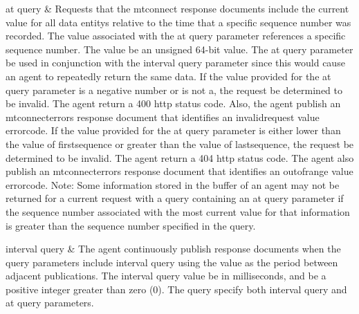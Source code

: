 \begin{longtabu}
\gls{at query}
&
Requests that the \glspl{mtconnect response document} \MUST include the current value for all \glspl{data entity} relative to the time that a specific \gls{sequence number} was recorded.
\newline The value associated with the \gls{at query} parameter references a specific \gls{sequence number}.  The value \MUST be an unsigned 64-bit value.
\newline The \gls{at query} parameter \MUSTNOT be used in conjunction with the \gls{interval query} parameter since this would cause an \gls{agent} to repeatedly return the same data. 
\newline If the value provided for the \gls{at query} parameter is a negative number or is not a, the \gls{request} \MUST be determined to be invalid.  The \gls{agent} \MUST return a 400 \gls{http status code}.  Also, the \gls{agent} \MUST publish an \gls{mtconnecterrors response document} that identifies an \gls{invalidrequest value} \gls{errorcode}. 
\newline If the value provided for the \gls{at query} parameter is either lower than the value of \gls{firstsequence} or greater than the value of \gls{lastsequence}, the \gls{request} \MUST be determined to be invalid.  The \gls{agent} \MUST return a 404 \gls{http status code}.  The \gls{agent} \MUST also publish an \gls{mtconnecterrors response document} that identifies an \gls{outofrange value} \gls{errorcode}. 
\newline Note:  Some information stored in the \gls{buffer} of an \gls{agent} may not be returned for a \gls{current request} with a \gls{query} containing an \gls{at query} parameter if the \gls{sequence number} associated with the most current value for that information is greater than the \gls{sequence number} specified in the \gls{query}.
\\ \hline

\gls{interval query}
&
The \gls{agent} \MUST continuously publish \glspl{response document} when the query parameters include \gls{interval query} using the value as the period between adjacent publications.
\newline The \gls{interval query} value \MUST be in milliseconds, and \MUST be a positive integer greater than zero (0).
\newline The \gls{query} \MUSTNOT specify both \gls{interval query} and \gls{at query} parameters. \\
\hline
\end{longtabu}